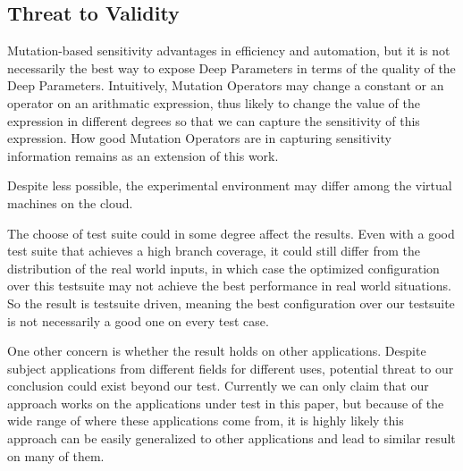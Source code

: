 \subsection{Threat to Validity}

Mutation-based sensitivity advantages in efficiency and automation, but it is not necessarily the best way to expose Deep Parameters in terms of the quality of the Deep Parameters. Intuitively, Mutation Operators may change a constant or an operator on an arithmatic expression, thus likely to change the value of the expression in different degrees so that we can capture the sensitivity of this expression. How good Mutation Operators are in capturing sensitivity information remains as an extension of this work.

Despite less possible, the experimental environment may differ among the virtual machines on the cloud. 

The choose of test suite could in some degree affect the results. Even with a good test suite that achieves a high branch coverage, it could still differ from the distribution of the real world inputs, in which case the optimized configuration over this testsuite may not achieve the best performance in real world situations. So the result is testsuite driven, meaning the best configuration over our testsuite is not necessarily a good one on every test case.

One other concern is whether the result holds on other applications. Despite subject applications from different fields for different uses, potential threat to our conclusion could exist beyond our test. Currently we can only claim that our approach works on the applications under test in this paper, but because of the wide range of where these applications come from, it is highly likely this approach can be easily generalized to other applications and lead to similar result on many of them.
